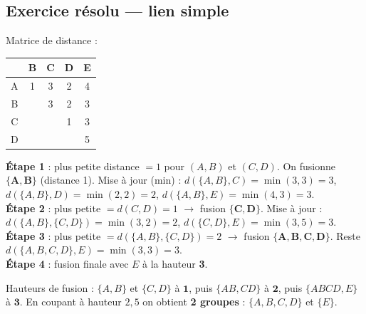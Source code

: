 \subsection{Exercice résolu — lien simple}
Matrice de distance :
\begin{center}\small
\begin{tabular}{c|cccc}
 & B & C & D & E\\\hline
A & 1 & 3 & 2 & 4\\
B &   & 3 & 2 & 3\\
C &   &   & 1 & 3\\
D &   &   &   & 5\\
\end{tabular}
\end{center}

\begin{Calcul}[: fusions successives (lien simple = min)]
\textbf{Étape 1} : plus petite distance $=1$ pour $(A,B)$ et $(C,D)$. On fusionne
$\mathbf{\{A,B\}}$ (distance 1). Mise à jour (min) :
$d(\{A,B\},C)=\min(3,3)=3$, $d(\{A,B\},D)=\min(2,2)=2$, $d(\{A,B\},E)=\min(4,3)=3$.\\[3pt]
\textbf{Étape 2} : plus petite $=d(C,D)=1$ $\rightarrow$ fusion $\mathbf{\{C,D\}}$. Mise à jour :
$d(\{A,B\},\{C,D\})=\min(3,2)=2$, $d(\{C,D\},E)=\min(3,5)=3$.\\[3pt]
\textbf{Étape 3} : plus petite $=d(\{A,B\},\{C,D\})=2$ $\rightarrow$ fusion
$\mathbf{\{A,B,C,D\}}$. Reste $d(\{A,B,C,D\},E)=\min(3,3)=3$.\\[3pt]
\textbf{Étape 4} : fusion finale avec $E$ à la hauteur \textbf{3}.
\end{Calcul}

\begin{Exemple}[dendrogramme]
Hauteurs de fusion : $\{A,B\}$ et $\{C,D\}$ à $\mathbf{1}$, puis $\{AB,CD\}$ à $\mathbf{2}$,
puis $\{ABCD,E\}$ à $\mathbf{3}$. En coupant à hauteur $2{,}5$ on obtient \textbf{2 groupes} :
$\{A,B,C,D\}$ et $\{E\}$.
\end{Exemple}

